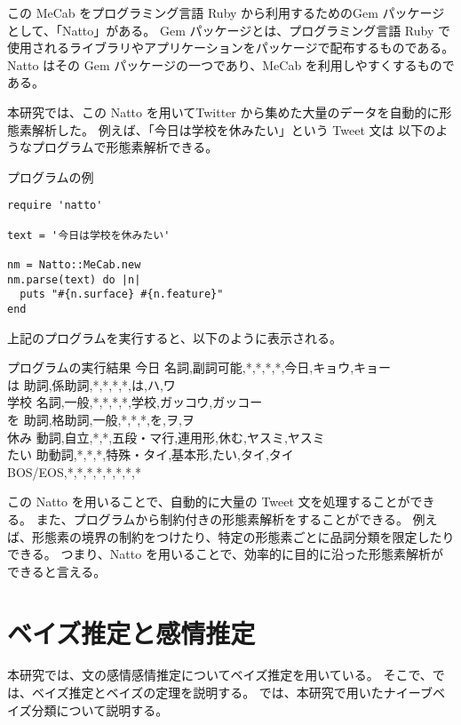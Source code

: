\documentclass[11pt,a4j]{jsarticle}
\begin{document}
この MeCab をプログラミング言語 Ruby から利用するためのGem パッケージとして、「Natto」がある。
Gem パッケージとは、プログラミング言語 Ruby で使用されるライブラリやアプリケーションをパッケージで配布するものである。
Natto はその Gem パッケージの一つであり、MeCab を利用しやすくするものである。

本研究では、この Natto を用いてTwitter から集めた大量のデータを自動的に形態素解析した。
例えば、「今日は学校を休みたい」という Tweet 文は 以下のようなプログラムで形態素解析できる。

\begin{itembox}[l]{プログラムの例}
\begin{verbatim}
require 'natto'

text = '今日は学校を休みたい'

nm = Natto::MeCab.new
nm.parse(text) do |n|
  puts "#{n.surface} #{n.feature}"
end
\end{verbatim}
\end{itembox}

上記のプログラムを実行すると、以下のように表示される。

\begin{itembox}[l]{プログラムの実行結果}
  今日  名詞,副詞可能,*,*,*,*,今日,キョウ,キョー \\
  は  助詞,係助詞,*,*,*,*,は,ハ,ワ\\ 
  学校  名詞,一般,*,*,*,*,学校,ガッコウ,ガッコー\\
  を  助詞,格助詞,一般,*,*,*,を,ヲ,ヲ\\
  休み  動詞,自立,*,*,五段・マ行,連用形,休む,ヤスミ,ヤスミ\\
  たい  助動詞,*,*,*,特殊・タイ,基本形,たい,タイ,タイ\\
 BOS/EOS,*,*,*,*,*,*,*,*\\
\end{itembox}

この Natto を用いることで、自動的に大量の Tweet 文を処理することができる。
また、プログラムから制約付きの形態素解析をすることができる。
例えば、形態素の境界の制約をつけたり、特定の形態素ごとに品詞分類を限定したりできる。
つまり、Natto を用いることで、効率的に目的に沿った形態素解析ができると言える。

\section{ベイズ推定と感情推定}\label{sec:def}
本研究では、文の感情感情推定についてベイズ推定を用いている。
そこで、では、ベイズ推定とベイズの定理を説明する。
では、本研究で用いたナイーブベイズ分類について説明する。
\end{document}
